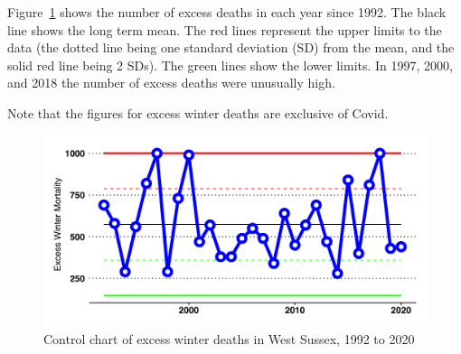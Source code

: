 Figure~\ref{fig:ewd_control_chart} shows the number of excess deaths in each year since 1992. The black line shows the long term mean. The red lines represent the upper limits to the data (the dotted line being one standard deviation (SD) from the mean, and the solid red line being 2 SDs). The green lines show the lower limits. In 1997, 2000, and 2018 the number of excess deaths were unusually high.

Note that the figures for excess winter deaths are exclusive of Covid.

\begin{figure}
    \caption{Control chart of excess winter deaths in West Sussex, 1992 to 2020}\label{fig:ewd_control_chart}
    \centering
    \includegraphics[width=\linewidth]{images/ewd_control_chart.png}
\end{figure}


